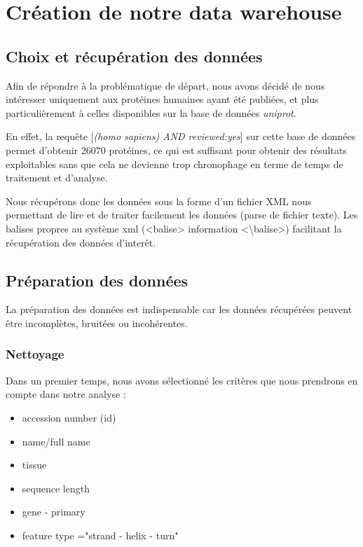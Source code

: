 \section*{Création de notre data warehouse}

\subsection*{Choix et récupération des données}


Afin de répondre à la problématique de départ, nous avons décidé de nous intéresser uniquement aux protéines humaines ayant été publiées, et plus particulièrement à celles disponibles sur la base de données \emph{uniprot}.

En effet, la requête [\emph{(homo sapiens) AND reviewed:yes}] sur cette base de données permet d'obtenir 26070 protéines, ce qui est suffisant pour obtenir des résultats exploitables sans que cela ne devienne trop chronophage en terme de temps de traitement et d'analyse.

Nous récupérons donc les données sous la forme d'un fichier XML nous permettant de lire et de traiter facilement les données (parse de fichier texte). Les balises propres au système xml (<balise> information <\textbackslash balise>) facilitant la récupération des données d'inter\^et.

\subsection*{Préparation des données}

La préparation des données est indispensable car les données récupérées peuvent être incomplètes, bruitées ou incohérentes. 

\subsubsection*{Nettoyage}
Dans un premier temps, nous avons sélectionné les critères que nous prendrons en compte dans notre analyse :
\renewcommand\labelitemi{\textbullet}
\begin{itemize}
\item accession number (id)
\item name/full name
\item tissue
\item sequence length
\item gene - primary
\item feature type ="strand  - helix - turn"\\
\end{itemize}

